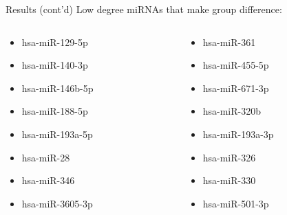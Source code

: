 \documentclass{beamer}
\begin{document}
\begin{frame}{Results (cont'd)}
	Low degree miRNAs that make group difference:
	\begin{columns}
		\begin{column}[t]{.48\textwidth}
			\begin{itemize}
				\item hsa-miR-129-5p
				\item hsa-miR-140-3p
				\item hsa-miR-146b-5p
				\item hsa-miR-188-5p
				\item hsa-miR-193a-5p
				\item hsa-miR-28
				\item hsa-miR-346
				\item hsa-miR-3605-3p
			\end{itemize}
		\end{column}
		\begin{column}[t]{.48\textwidth}
			\begin{itemize}
				\item hsa-miR-361
				\item hsa-miR-455-5p
				\item hsa-miR-671-3p
				\item hsa-miR-320b
				\item hsa-miR-193a-3p
				\item hsa-miR-326
				\item hsa-miR-330
				\item hsa-miR-501-3p
			\end{itemize}
		\end{column}
	\end{columns}
  \end{frame}
\end{document}
